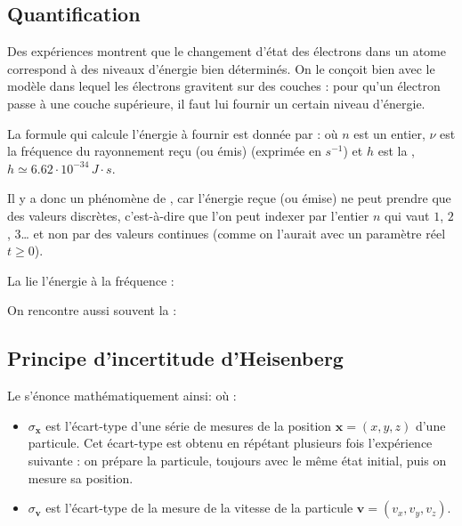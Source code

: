 \documentclass[11pt,class=report,crop=false]{standalone}
\begin{document}
\subsection{Quantification}

Des expériences montrent que le changement d'état des électrons dans un atome correspond à des niveaux d'énergie bien déterminés.
On le conçoit bien avec le modèle dans lequel les électrons gravitent sur des couches : pour qu'un électron passe à une couche supérieure, il faut lui fournir un certain niveau d'énergie.


La formule qui calcule l'énergie à fournir est donnée par :
où $n$ est un entier, $\nu$ est la fréquence du rayonnement reçu (ou émis) (exprimée en $s^{-1}$)
et $h$ est la , $h \simeq 6.62 \cdot 10^{-34} \, J\cdot s$.

Il y a donc un phénomène de , car l'énergie reçue (ou émise) ne peut prendre que des valeurs discrètes, c'est-à-dire que l'on peut indexer par l'entier $n$ qui vaut $1$, $2$, $3$\ldots{}  et non par des valeurs continues (comme on l'aurait avec un paramètre réel $t \ge 0$).

La  lie l'énergie à la fréquence :


On rencontre aussi souvent la :

\subsection{Principe d'incertitude d'Heisenberg}

Le  s'énonce mathématiquement ainsi:
où :
\begin{itemize}
    \item $\sigma_{\mathbf x}$ est l'écart-type d'une série de mesures de la position $\mathbf x = (x,y,z)$ d'une particule. Cet écart-type est obtenu en répétant plusieurs fois l'expérience suivante : on prépare la particule, toujours avec le même état initial, puis on mesure sa position.
    
    \item $\sigma_{\mathbf v}$ est l'écart-type de la mesure de la vitesse de la particule $\mathbf v = (v_x,v_y,v_z)$.
\end{itemize}
\end{document}
